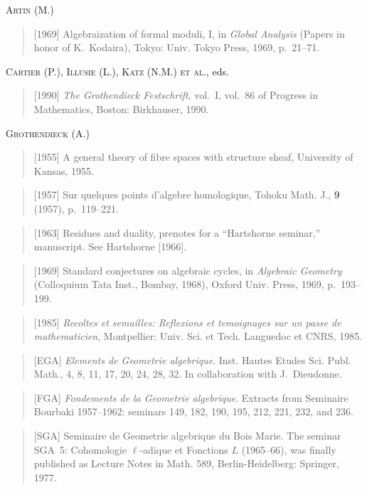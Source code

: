 \documentclass[11pt,a4paper]{article}
\theoremstyle{plain}
\theoremstyle{definition}
\begin{document}
\medskip

\noindent\textsc{Artin (M.)}
\begin{quote}
[1969] Algebraization of formal moduli, I, in \emph{Global Analysis} (Papers in honor of K.~Kodaira), Tokyo: Univ. Tokyo Press, 1969, p.~21--71.
\end{quote}

\medskip
\noindent\textsc{Cartier (P.), Illusie (L.), Katz (N.M.) et al.}, eds.
\begin{quote}
[1990] \emph{The Grothendieck Festschrift}, vol.~I, vol.~86 of Progress in Mathematics, Boston: Birkhauser, 1990.
\end{quote}

\medskip
\noindent\textsc{Grothendieck (A.)}
\begin{quote}
[1955] A general theory of fibre spaces with structure sheaf, University of Kansas, 1955.
\end{quote}
\begin{quote}
[1957] Sur quelques points d'algebre homologique, Tohoku Math. J., \textbf{9} (1957), p.~119--221.
\end{quote}
\begin{quote}
[1963] Residues and duality, prenotes for a ``Hartshorne seminar,'' manuscript. See Hartshorne [1966].
\end{quote}
\begin{quote}
[1969] Standard conjectures on algebraic cycles, in \emph{Algebraic Geometry} (Colloquium Tata Inst., Bombay, 1968), Oxford Univ. Press, 1969, p.~193--199.
\end{quote}
\begin{quote}
[1985] \emph{Recoltes et semailles: Reflexions et temoignages sur un passe de mathematicien}, Montpellier: Univ. Sci. et Tech. Languedoc et CNRS, 1985.
\end{quote}
\begin{quote}
[EGA] \emph{Elements de Geometrie algebrique}. Inst. Hautes Etudes Sci. Publ. Math., 4, 8, 11, 17, 20, 24, 28, 32. In collaboration with J.~Dieudonne.
\end{quote}
\begin{quote}
[FGA] \emph{Fondements de la Geometrie algebrique}. Extracts from Seminaire Bourbaki 1957--1962: seminars 149, 182, 190, 195, 212, 221, 232, and 236.
\end{quote}
\begin{quote}
[SGA] Seminaire de Geometrie algebrique du Bois Marie. The seminar SGA~5: Cohomologie $\ell$-adique et Fonctions $L$ (1965--66), was finally published as Lecture Notes in Math. 589, Berlin-Heidelberg: Springer, 1977.
\end{quote}
\end{document}
